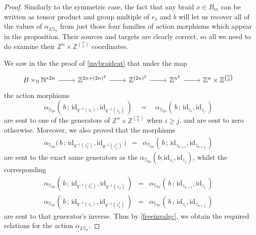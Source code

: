 \documentclass{amsbook} %
\numberwithin{section}{chapter}
\begin{document}
\begin{proof}
Similarly to the symmetric case, the fact that any braid $x \in B_m$ can be written as tensor product and group multiple of $e_1$ and $b$ will let us recover all of the values of $\alpha_{L\mathbb{S}_n}$ from just those four families of action morphisms which appear in the proposition. Their sources and targets are clearly correct, so all we need to do examine their $\mathbb{Z}^{n} \times \mathbb{Z}^{{n}\choose{2}}$ coordinates.

We saw in the the proof of \cref{invbraidcat} that under the map
\[ \begin{tikzcd}
B \times_{\mathbb{N}} \mathbb{N}^{\ast 2n} \ar[r] & \mathbb{Z}^{2n + (2n)^2} \ar[r] & \mathbb{Z}^{(2n)^2} \ar[r] & \mathbb{Z}^{n^2} \ar[r] & \mathbb{Z}^{n} \times \mathbb{Z}^{{n}\choose{2}} 
\end{tikzcd} \]
the action morphisms
\[ \alpha_{\mathbb{S}_{2n}}( \, b \, ; \, \mathrm{id}_{q^{-1}(z_i)}, \mathrm{id}_{q^{-1}(z_j)} \, ) \quad = \quad \alpha_{\mathbb{S}_{2n}}( \, b \, ; \, \mathrm{id}_{z_i}, \mathrm{id}_{z_j} \, ) \]
are sent to one of the generators of $\mathbb{Z}^{n} \times \mathbb{Z}^{{n}\choose{2}}$ when $i \ge j$, and are sent to zero otherwise. Moreover, we also proved that the morphisms
\[ \begin{array}{rll} 
			\alpha_{\mathbb{S}_{2n}}( \, b \, ; \, \mathrm{id}_{q^{-1}(z_i^*)}, \mathrm{id}_{q^{-1}(z_j^*)} \, \big) & = & \alpha_{\mathbb{S}_{2n}}( \, b \, ; \, \mathrm{id}_{z_{n+i}}, \mathrm{id}_{z_{n+j}} \, )
		\end{array}
\]
are sent to the exact same generators as the $\alpha_{\mathbb{S}_{2n}}(b;\mathrm{id}_{z_i}, \mathrm{id}_{z_j})$, whilst the corresponding
\[ \begin{array}{rll}
			\alpha_{\mathbb{S}_{2n}}( \, b\, ; \, \mathrm{id}_{q^{-1}(z_i^*)}, \mathrm{id}_{q^{-1}(z_j)} \, ) & = & \alpha_{\mathbb{S}_{2n}}( \, b \, ; \, \mathrm{id}_{z_{n+i}}, \mathrm{id}_{z_j} \, ) \\
			\alpha_{\mathbb{S}_{2n}}( \, b \, ; \, \mathrm{id}_{q^{-1}(z_i)}, \mathrm{id}_{q^{-1}(z_j^*)} \, ) & = & \alpha_{\mathbb{S}_{2n}}( \, b \, ; \, \mathrm{id}_{z_i}, \mathrm{id}_{z_{n+j}} \, ) 
		\end{array}
\]
are sent to that generator's inverse. Thus by \cref{freeinvalgc}, we obtain the required relations for the action $\alpha_{L\mathbb{S}_n}$.
\end{proof}
\end{document}
